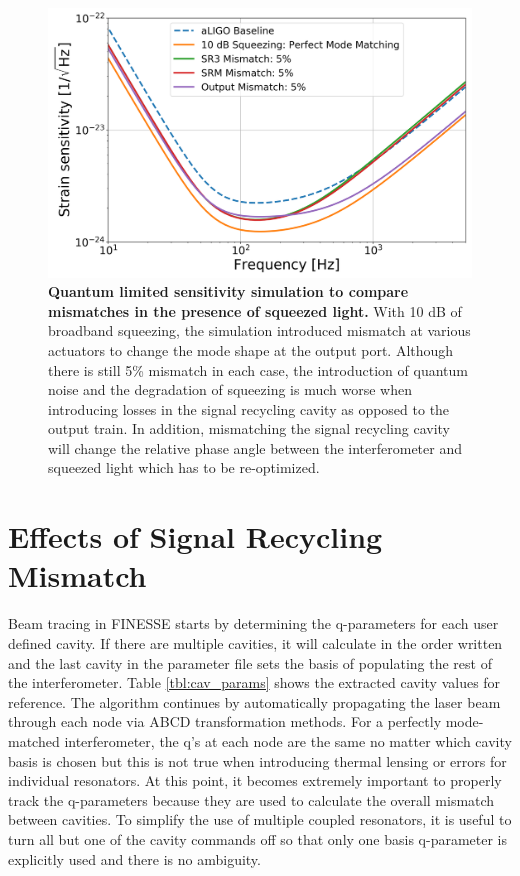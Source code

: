 	\begin{figure}[t!]
		\centering
		\includegraphics[width=1.0 \textwidth]{../Figures/QM_sens_compare_mismatches.png}
		\caption[Quantum limited sensitivity simulation to compare mismatches in the presence of squeezed light.]
		{\textbf{Quantum limited sensitivity simulation to compare mismatches in the presence of squeezed light.} 
			With 10 dB of broadband squeezing, the simulation introduced mismatch at various actuators to change the mode shape at the output port.  Although there is still 5\% mismatch in each case, the introduction of quantum noise and the degradation of squeezing is much worse when introducing losses in the signal recycling cavity as opposed to the output train.  In addition, mismatching the signal recycling cavity will change the relative phase angle between the interferometer and squeezed light which has to be re-optimized.	
		}
		\label{fig:QM_lim_sens_mismatch}
	\end{figure}
	\section{Effects of Signal Recycling Mismatch}
	Beam tracing in FINESSE starts by determining the q-parameters for each user defined cavity. If there are multiple cavities, it will calculate in the order written and the last cavity in the parameter file sets the basis of populating the rest of the interferometer.  Table \ref{tbl:cav_params} shows the extracted cavity values for reference.  The algorithm continues by automatically propagating the laser beam through each node via ABCD transformation methods. For a perfectly mode-matched interferometer, the q's at each node are the same no matter which cavity basis is chosen but this is not true when introducing thermal lensing or errors for individual resonators.   At this point, it becomes extremely important to properly track the q-parameters because they are used to calculate the overall mismatch between cavities. To simplify the use of multiple coupled resonators, it is useful to turn all but one of the cavity commands off so that only one basis q-parameter is explicitly used and there is no ambiguity.  
	
